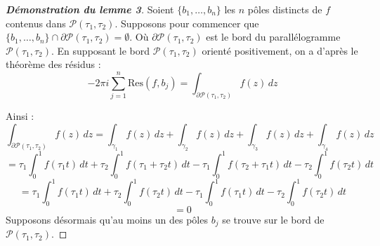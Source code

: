 \documentclass[12pt]{article}
\begin{document}
    \begin{proof}[\textbf{Démonstration du lemme 3}]
    Soient \( \{b_1, \ldots, b_n \} \) les \( n \) pôles distincts de \( f \) contenus dans \( \mathcal{P}(\tau_1, \tau_2) \).
    Supposons pour commencer que \( \{b_1, \ldots, b_n\} \cap \partial \mathcal{P}(\tau_1, \tau_2) = \emptyset \). Où $  \partial \mathcal{P}(\tau_1, \tau_2)$ est le bord du parallélogramme $\mathcal{P}(\tau_1, \tau_2)$.
    En supposant le bord \( \mathcal{P}(\tau_1, \tau_2) \) orienté positivement, on a d'après le théorème des résidus :
    \[
    -2\pi i \sum_{j=1}^n \text{Res}(f, b_j) = \int_{\partial \mathcal{P}(\tau_1,\tau_2)} f(z) \, dz
    \]

    \begin{center}
    \end{center}

    Ainsi :
    \[
    \int_{\partial \mathcal{P}(\tau_1,\tau_2)} f(z) \, dz = \int_{\gamma_1} f(z) \, dz + \int_{\gamma_2} f(z) \, dz + \int_{\gamma_3} f(z) \, dz + \int_{\gamma_4} f(z) \, dz
    \]
    \[
    = \tau_1 \int_0^1 f(\tau_1 t) \, dt + \tau_2 \int_0^1 f(\tau_1 + \tau_2 t) \, dt - \tau_1 \int_0^1 f(\tau_2 + \tau_1 t) \, dt - \tau_2 \int_0^1 f(\tau_2 t) \, dt
    \]
    \[
    = \tau_1 \int_0^1 f(\tau_1 t) \, dt + \tau_2 \int_0^1 f(\tau_2 t) \, dt - \tau_1 \int_0^1 f(\tau_1 t) \, dt - \tau_2 \int_0^1 f(\tau_2 t) \, dt
    \]
    \[
    = 0
    \]
    Supposons désormais qu'au moins un des pôles \( b_j \) se trouve sur le bord de \( \mathcal{P}(\tau_1, \tau_2) \).


\end{proof}
\end{document}
